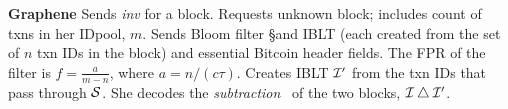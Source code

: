 
{
\begin{myprot}{\textbf{Graphene}}
\label{protocol:pblt}
\STATE \sender Sends \textit{inv} for a block.
%
\STATE \recvr \hspace{-.1mm}Requests unknown block; includes count of txns in her IDpool, $m$.
\STATE \sender  Sends Bloom filter \S and IBLT \I (each created from the set of $n$ txn IDs in the block) and essential Bitcoin header fields.  The FPR of the filter is $f=\frac{a}{m-n}$, where $a=n/(c\tau)$.%
%
\STATE \recvr Creates IBLT $\cal{I}'$ from the txn IDs that pass through $\cal{S}$. She decodes the {\em subtraction}~\cite{eppstein:2011} of the two blocks, $\cal{I} \bigtriangleup \cal{I'}$.\end{myprot}
}
